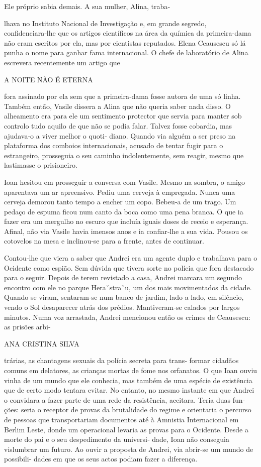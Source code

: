 Ele próprio sabia demais. A sua mulher, Alina, traba‑

lhava no Instituto Nacional de Investigação e, em grande segredo,
confidenciara‑lhe que os artigos científicos na área da química da
primeira‑dama não eram escritos por ela, mas por cientistas reputados.
Elena Ceausescu só lá punha o nome para ganhar fama internacional. O
chefe de laboratório de Alina escrevera recentemente um artigo que

A NOITE NÃO É ETERNA

fora assinado por ela sem que a primeira‑dama fosse autora de uma só
linha. Também então, Vasile dissera a Alina que não queria saber nada
disso. O alheamento era para ele um sentimento protector que servia para
manter sob controlo tudo aquilo de que não se podia falar. Talvez fosse
cobardia, mas ajudava‑o a viver melhor o quoti‑ diano. Quando via alguém
a ser preso na plataforma dos comboios internacionais, acusado de tentar
fugir para o estrangeiro, prosseguia o seu caminho indolentemente, sem
reagir, mesmo que lastimasse o prisioneiro.

Ioan hesitou em prosseguir a conversa com Vasile. Mesmo na sombra, o
amigo aparentava um ar apreensivo. Pediu uma cerveja à empregada. Nunca
uma cerveja demorou tanto tempo a encher um copo. Bebeu‑a de um trago.
Um pedaço de espuma ficou num canto da boca como uma pena branca. O que
ia fazer era um mergulho no escuro que incluía iguais doses de receio e
esperança. Afinal, não via Vasile havia imensos anos e ia confiar‑lhe a
sua vida. Pousou os cotovelos na mesa e inclinou‑se para a frente, antes
de continuar.

Contou‑lhe que viera a saber que Andrei era um agente duplo e trabalhava
para o Ocidente como espião. Sem dúvida que tivera sorte no polícia que
fora destacado para o seguir. Depois de terem revistado a casa, Andrei
marcara um segundo encontro com ele no parque Heraˇstraˇu, um dos mais
movimentados da cidade. Quando se viram, sentaram‑se num banco de
jardim, lado a lado, em silêncio, vendo o Sol desaparecer atrás dos
prédios. Mantiveram‑se calados por largos minutos. Numa voz arrastada,
Andrei mencionou então os crimes de Ceausescu: as prisões arbi‑

ANA CRISTINA SILVA

trárias, as chantagens sexuais da polícia secreta para trans‑ formar
cidadãos comuns em delatores, as crianças mortas de fome nos orfanatos.
O que Ioan ouviu vinha de um mundo que ele conhecia, mas também de uma
espécie de existência que de certo modo tentara evitar. No entanto, no
mesmo instante em que Andrei o convidara a fazer parte de uma rede da
resistência, aceitara. Teria duas fun‑ ções: seria o receptor de provas
da brutalidade do regime e orientaria o percurso de pessoas que
transportariam documentos até à Amnistia Internacional em Berlim Leste,
donde um operacional levaria as provas para o Ocidente. Desde a morte do
pai e o seu despedimento da universi‑ dade, Ioan não conseguia
vislumbrar um futuro. Ao ouvir a proposta de Andrei, via abrir‑se um
mundo de possibili‑ dades em que os seus actos podiam fazer a diferença.

